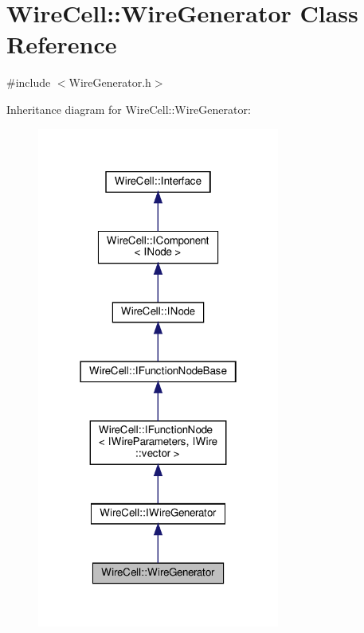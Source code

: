 \hypertarget{class_wire_cell_1_1_wire_generator}{}\section{Wire\+Cell\+:\+:Wire\+Generator Class Reference}
\label{class_wire_cell_1_1_wire_generator}


{\ttfamily \#include $<$Wire\+Generator.\+h$>$}



Inheritance diagram for Wire\+Cell\+:\+:Wire\+Generator\+:
\nopagebreak
\begin{figure}[H]
\begin{center}
\leavevmode
\includegraphics[width=226pt]{class_wire_cell_1_1_wire_generator__inherit__graph}
\end{center}
\end{figure}


